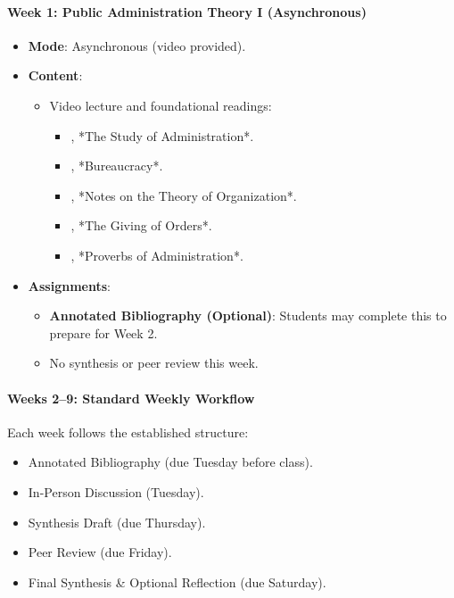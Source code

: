 \documentclass[12pt, letterpaper]{article}
\begin{document}
\paragraph{Week 1: Public Administration Theory I (Asynchronous)}
\begin{itemize}
    \item \textbf{Mode}: Asynchronous (video provided).
    \item \textbf{Content}:
    \begin{itemize}
        \item Video lecture and foundational readings:
        \begin{itemize}
            \item \citet{wilson1887}, *The Study of Administration*.
            \item \citet{Weber1946}, *Bureaucracy*.
            \item \citet{gulick1937}, *Notes on the Theory of Organization*.
            \item \citet{Follett1926}, *The Giving of Orders*.
            \item \citet{simon1946}, *Proverbs of Administration*.
        \end{itemize}
    \end{itemize}
    \item \textbf{Assignments}:
    \begin{itemize}
        \item \textbf{Annotated Bibliography (Optional)}: Students may complete this to prepare for Week 2.
        \item No synthesis or peer review this week.
    \end{itemize}
\end{itemize}

\paragraph{Weeks 2--9: Standard Weekly Workflow}
Each week follows the established structure:
\begin{itemize}
    \item Annotated Bibliography (due Tuesday before class).
    \item In-Person Discussion (Tuesday).
    \item Synthesis Draft (due Thursday).
    \item Peer Review (due Friday).
    \item Final Synthesis \& Optional Reflection (due Saturday).
\end{itemize}
\end{document}
